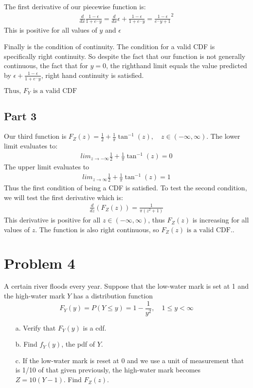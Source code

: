 \documentclass{article}
\begin{document}
The first derivative of our piecewise function is:
\begin{align*}
\frac{d}{dx}\frac{1-\epsilon}{1+e^-y} = \frac{d}{dx} \epsilon + \frac{1-\epsilon}{1+e^-y} =\frac{1-\epsilon}{e^-y+1}^2
\end{align*}
This is positive for all values of $y$ and $\epsilon$

Finally is the condition of continuity. The condition for a valid CDF is specifically right continuity. So despite the fact that our function is not generally continuous, the fact that for $y=0$, the righthand limit equals the value predicted by $\epsilon + \frac{1-\epsilon}{1+e^-y}$, right hand continuity is satisfied.

$\boxed{\text{Thus, }F_Y\text{ is a valid CDF}}$

\subsection*{Part 3}
Our third function is $F_Z(z) = \frac{1}{2} +\frac{1}{\pi} \tan^{-1}(z), \quad z\in(-\infty,\infty)$.
The lower limit evaluates to:
\begin{align*}
lim_{z\rightarrow -\infty} \frac{1}{2} +\frac{1}{\pi} \tan^{-1}(z) = 0
\end{align*}
The upper limit evaluates to
\begin{align*}
lim_{z\rightarrow \infty} \frac{1}{2} +\frac{1}{\pi} \tan^{-1}(z) = 1
\end{align*}
Thus the first condition of being a CDF is satisfied. To test the second condition, we will test the first derivative which is:
\begin{align*}
\frac{d}{dz}(F_Z(z)) = \frac{1}{\pi(z^2+1)}
\end{align*}
This derivative is positive for all $z\in(-\infty,\infty)$, thus $F_Z(z)$ is increasing for all values of $z$. The function is also right continuous, so $\boxed{F_Z(z)\text{ is a valid CDF.}}$.

\clearpage
\section*{Problem 4}
A certain river floods every year. Suppose that the low-water mark is set at 1 and the high-water mark $Y$ has a distribution function
    \[
    F_Y(y) =P(Y\le y) = 1 - \frac{1}{y^2},  \quad 1 \le y < \infty
    \]
    \begin{enumerate}
    \item[a.]
      Verify that $F_Y(y)$ is a cdf.
    \item[]
    \item[b.]
      Find $f_Y(y)$, the pdf of $Y$.
    \item[]
    \item[c.]
      If the low-water mark is reset at 0 and we use a unit of measurement that is 1/10 of that given previously, the high-water mark becomes $Z = 10(Y-1)$. Find $F_Z(z)$.
    \item[]
    \end{enumerate}
\end{document}
